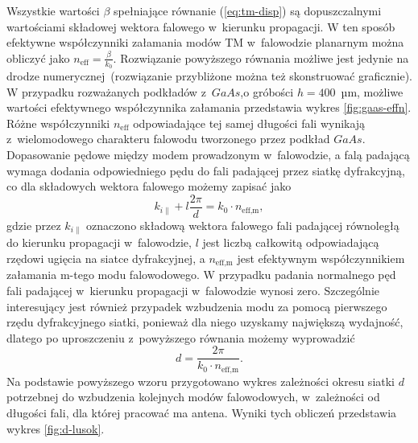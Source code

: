 Wszystkie wartości $\beta$ spełniające  równanie (\ref{eq:tm-disp}) są dopuszczalnymi wartościami składowej wektora falowego w~kierunku propagacji. W ten sposób efektywne współczynniki załamania modów TM w~falowodzie planarnym można obliczyć jako $n_{\textrm{eff}}=\frac{\beta}{k_0}$. Rozwiązanie powyższego równania możliwe jest jedynie na drodze numerycznej~(rozwiązanie przybliżone można też skonstruować graficznie). W przypadku rozważanych podkładów z~$GaAs$,o gróbości $h=400$~µm, możliwe wartości efektywnego współczynnika załamania przedstawia wykres \ref{fig:gaas-effn}. Różne współczynniki $n_{\textrm{eff}}$ odpowiadające tej samej długości fali wynikają z~wielomodowego charakteru falowodu tworzonego przez podkład $GaAs$. Dopasowanie pędowe między modem prowadzonym w~falowodzie, a falą padającą wymaga dodania odpowiedniego pędu do fali padającej przez siatkę dyfrakcyjną, co dla składowych wektora falowego możemy zapisać jako
\begin{equation}
k_{i \parallel} + l \frac{2\pi}{d} = k_0 \cdot n_{\textrm{eff,m}} , 
\end{equation}
gdzie przez $k_{i \parallel}$ oznaczono składową wektora falowego fali padającej równoległą do kierunku propagacji w~falowodzie, $l$ jest liczbą całkowitą odpowiadającą rzędowi ugięcia na siatce dyfrakcyjnej, a $n_{\textrm{eff,m}}$ jest efektywnym współczynnikiem załamania m-tego modu falowodowego. W przypadku padania normalnego pęd fali padającej w~kierunku propagacji w~falowodzie wynosi zero. Szczególnie interesujący jest również przypadek wzbudzenia modu za pomocą pierwszego rzędu dyfrakcyjnego siatki, ponieważ dla niego uzyskamy największą wydajność, dlatego po uproszczeniu z~powyższego równania możemy wyprowadzić
\begin{equation}
d=\frac{2 \pi}{k_0 \cdot n_{\textrm{eff,m}}}.
\label{eq:d-do-wzbudzenia}
\end{equation}
Na podstawie powyższego wzoru przygotowano wykres zależności okresu siatki $d$ potrzebnej do wzbudzenia kolejnych modów falowodowych, w~zależności od długości fali, dla której pracować ma antena. Wyniki tych obliczeń przedstawia wykres \ref{fig:d-lusok}.

